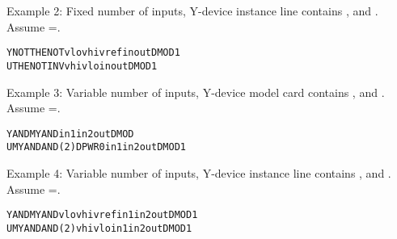 Example 2: Fixed number of inputs, Y-device instance line contains ,
 and .  Assume =.

\begin{alltt}
YNOT THENOT vlo vhi vref in out DMOD1
UTHENOT INV vhi vlo in out DMOD1
\end{alltt}

Example 3: Variable number of inputs, Y-device model card contains ,
 and .  Assume =.

\begin{alltt}
YAND MYAND in1 in2 out DMOD
UMYAND AND(2) DPWR 0 in1 in2 out DMOD1
\end{alltt}

Example 4: Variable number of inputs, Y-device instance line contains ,
 and .  Assume =.

\begin{alltt}
YAND MYAND vlo vhi vref in1 in2 out DMOD1
UMYAND AND(2) vhi vlo in1 in2 out DMOD1
\end{alltt}


